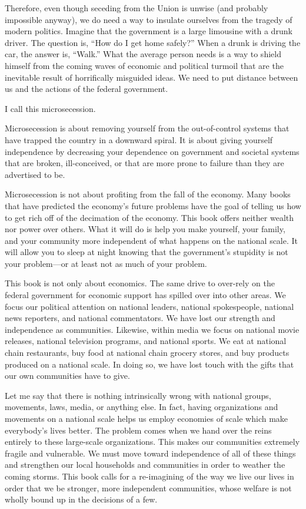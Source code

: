Therefore, even though seceding from the Union is unwise (and probably 
impossible anyway), we do need a
way to insulate ourselves from the tragedy of modern politics. Imagine
that the government is a large limousine with a drunk driver. The
question is, “How do I get home safely?”  When a drunk is driving the
car, the answer is, “Walk.”  What the average person needs is a way to
shield himself from the coming waves of economic and political turmoil
that are the inevitable result of horrifically misguided ideas. We need
to put distance between us and the actions of the federal government. 

I call this microsecession.

Microsecession is about removing yourself from the out-of-control systems
that have trapped the country in a downward spiral.  It is about giving
yourself independence by decreasing your dependence on government
and societal systems that are broken, ill-conceived, or that are 
more prone to failure than they are advertised to be.  

Microsecession is not about profiting from the fall of the economy.
Many books that have predicted the economy’s future problems have the
goal of telling us how to get rich off of the decimation of the
economy. This book
offers neither wealth
nor power over others. What it will do is help you make
yourself, your
family, and your community more independent of what happens on the
national scale. It will allow you to sleep at night knowing that
the government’s
stupidity is not your problem---or at least not as much of your problem.

This book is not only about economics. The same drive to over-rely on
the federal government for economic support has spilled over into other
areas. We focus our political attention on national leaders, national
spokespeople, national news reporters, and national commentators. We
have lost our strength and independence as communities. Likewise,
within media we focus on national movie releases, national television
programs, and national sports. We eat at national chain restaurants,
buy food at national chain grocery stores, and buy products produced on
a national scale. In doing so, we have lost touch with the gifts that
our own communities have to give. 

Let me say that there is nothing intrinsically wrong with national
groups, movements, laws, media, or anything else. In fact, having
organizations and movements on a national scale helps us employ
economies of scale which make everybody’s lives better. The problem
comes when we hand over the reins entirely to these large-scale
organizations. This makes our communities extremely fragile and
vulnerable. We must move toward independence of all of these things and
strengthen our local households and communities in order to weather the
coming storms. This book calls for a re-imagining of the way we live
our lives in order that we be stronger, more independent communities,
whose welfare is not wholly bound up in the decisions of a few.


